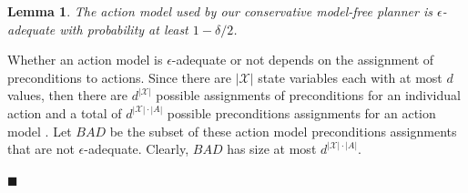 \documentclass{article}
\newtheorem{lemma}{Lemma}
\newenvironment{proof}{\noindent{\bf Proof:~~}}{\qed}
\newcommand{\qed}{\hfill\ensuremath{\blacksquare}}
\begin{document}
		\begin{lemma}
            The action model used by our conservative model-free planner is $\epsilon$-adequate with probability at least $1-\delta/2$.
			\label{lem:action-model-ok}
		\end{lemma}
		\begin{proof}
		Whether an action model is $\epsilon$-adequate or not depends on the assignment of preconditions to actions. 
		Since there are $|\mathcal{X}|$ state variables each with at most $d$ values, 
		then there are $d^{|\mathcal{X}|}$ possible assignments of preconditions for an individual action
		and a total of $d^{|\mathcal{X}|\cdot |A|}$ possible preconditions assignments for an action model . 
		Let $BAD$ be the subset of these action model preconditions assignments that are not $\epsilon$-adequate. 
		Clearly, $BAD$ has size at most $d^{|\mathcal{X}|\cdot |A|}$. 
		

\end{proof}
\end{document}
